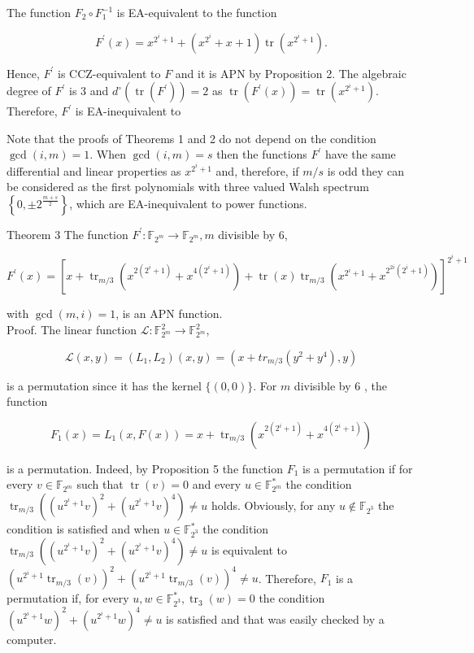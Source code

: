 \documentclass[10pt]{article}
\begin{document}
The function $F_{2} \circ F_{1}^{-1}$ is EA-equivalent to the function

$$
F^{\prime}(x)=x^{2^{i}+1}+\left(x^{2^{i}}+x+1\right) \operatorname{tr}\left(x^{2^{i}+1}\right) .
$$

Hence, $F^{\prime}$ is CCZ-equivalent to $F$ and it is APN by Proposition 2. The algebraic degree of $F^{\prime}$ is 3 and $d^{\circ}\left(\operatorname{tr}\left(F^{\prime}\right)\right)=2$ as $\operatorname{tr}\left(F^{\prime}(x)\right)=\operatorname{tr}\left(x^{2^{i}+1}\right)$. Therefore, $F^{\prime}$ is EA-inequivalent to

Note that the proofs of Theorems 1 and 2 do not depend on the condition $\operatorname{gcd}(i, m)=1$. When $\operatorname{gcd}(i, m)=s$ then the functions $F^{\prime}$ have the same differential and linear properties as $x^{2^{i}+1}$ and, therefore, if $m / s$ is odd they can be considered as the first polynomials with three valued Walsh spectrum $\left\{0, \pm 2^{\frac{m+s}{2}}\right\}$, which are EA-inequivalent to power functions.

Theorem 3 The function $F^{\prime}: \mathbb{F}_{2^{m}} \rightarrow \mathbb{F}_{2^{m}}, m$ divisible by 6,

$$
F^{\prime}(x)=\left[x+\operatorname{tr}_{m / 3}\left(x^{2\left(2^{i}+1\right)}+x^{4\left(2^{i}+1\right)}\right)+\operatorname{tr}(x) \operatorname{tr}_{m / 3}\left(x^{2^{i}+1}+x^{2^{2 i}\left(2^{i}+1\right)}\right)\right]^{2^{i}+1}
$$

with $\operatorname{gcd}(m, i)=1$, is an APN function.\\
Proof. The linear function $\mathcal{L}: \mathbb{F}_{2^{m}}^{2} \rightarrow \mathbb{F}_{2^{m}}^{2}$,

$$
\mathcal{L}(x, y)=\left(L_{1}, L_{2}\right)(x, y)=\left(x+t r_{m / 3}\left(y^{2}+y^{4}\right), y\right)
$$

is a permutation since it has the kernel $\{(0,0)\}$. For $m$ divisible by 6 , the function

$$
F_{1}(x)=L_{1}(x, F(x))=x+\operatorname{tr}_{m / 3}\left(x^{2\left(2^{i}+1\right)}+x^{4\left(2^{i}+1\right)}\right)
$$

is a permutation. Indeed, by Proposition 5 the function $F_{1}$ is a permutation if for every $v \in \mathbb{F}_{2^{m}}$ such that $\operatorname{tr}(v)=0$ and every $u \in \mathbb{F}_{2^{m}}^{*}$ the condition $\operatorname{tr}_{m / 3}\left(\left(u^{2^{i}+1} v\right)^{2}+\left(u^{2^{i}+1} v\right)^{4}\right) \neq u$ holds. Obviously, for any $u \notin \mathbb{F}_{2^{3}}$ the condition is satisfied and when $u \in \mathbb{F}_{2^{3}}^{*}$ the condition $\operatorname{tr}_{m / 3}\left(\left(u^{2^{i}+1} v\right)^{2}+\left(u^{2^{i}+1} v\right)^{4}\right) \neq u$ is equivalent to $\left(u^{2^{i}+1} \operatorname{tr}_{m / 3}(v)\right)^{2}+\left(u^{2^{i}+1} \operatorname{tr}_{m / 3}(v)\right)^{4} \neq u$. Therefore, $F_{1}$ is a permutation if, for every $u, w \in \mathbb{F}_{2^{3}}^{*}, \operatorname{tr}_{3}(w)=0$ the condition $\left(u^{2^{i}+1} w\right)^{2}+ \left(u^{2^{i}+1} w\right)^{4} \neq u$ is satisfied and that was easily checked by a computer.
\end{document}
